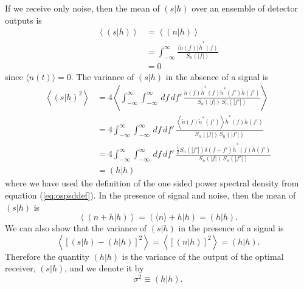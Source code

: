 If we receive only noise, then the mean of $(s|h)$ over an ensemble of detector
outputs is 
\begin{equation}
\begin{split}
\left\langle (s|h) \right\rangle &= \left\langle (n|h) \right\rangle \\
&= \int_{-\infty}^{\infty} 
   \frac{\langle\tilde{n}(f)\rangle \tilde{h}^\ast(f)}{S_n(|f|)} \\
&= 0
\end{split}
\end{equation}
since $\langle n(t) \rangle = 0$. The variance of $(s|h)$ in the absence of
a signal is
\begin{equation}
\begin{split}
\left\langle(s|h)^2\right\rangle 
&= 4 \left\langle \int_{-\infty}^\infty \int_{-\infty}^\infty \,df\,df'\,
\frac{\tilde{n}(f)\tilde{h}^\ast(f) \tilde{n}^\ast(f')\tilde{h}(f')}
{S_n(|f|)\,S_n(|f'|)} \right\rangle \\
&= 4 \int_{-\infty}^\infty \int_{-\infty}^\infty \,df\,df'\,
\frac{\left\langle \tilde{n}(f)\tilde{n}^\ast(f')\right\rangle\tilde{h}^\ast(f)\tilde{h}(f')}
{S_n(|f|)\,S_n(|f'|)} \\
&= 4 \int_{-\infty}^\infty \int_{-\infty}^\infty \,df\,df'\,
\frac{\frac{1}{2}S_n(|f'|)\delta(f-f') \tilde{h}^\ast(f)\tilde{h}(f')}
{S_n(|f|)\,S_n(|f'|)} \\
&= (h|h)
\end{split}
\label{eq:filtervariance}
\end{equation}
where we have used the definition of the one sided power spectral density from
equation (\ref{eq:ospsddef}).  In the presence of signal and noise, then the
mean of $(s|h)$ is
\begin{equation}
\left\langle (n+h|h) \right\rangle = (\langle n \rangle + h|h) = (h|h).
\end{equation}
We can also show that the variance of $(s|h)$ in the presence of a signal is
\begin{equation}
\left\langle \left[ (s|h) - (h|h) \right]^2 \right\rangle
= \left\langle \left[ (n|h) \right]^2 \right\rangle
= (h|h).
\end{equation}
Therefore the quantity $(h|h)$ is the variance of the output of the optimal
receiver, $(s|h)$, and we denote it by
\begin{equation}
\sigma^2 \equiv (h|h).
\label{eq:sigmasqdef}
\end{equation}

